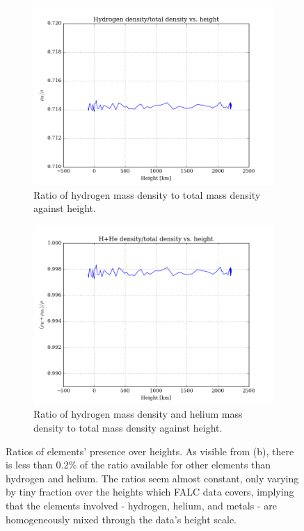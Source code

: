 \documentclass[11pt,a4paper,notitlepage]{article}
\begin{document}
\begin{figure}[H]
\center

	\begin{subfigure}{0.49\textwidth}
	\includegraphics[scale=0.42]{../figs/ratio_Hmassdens_of_dens_vs_h.png}
	\caption{Ratio of hydrogen mass density to total mass density against height.}
	\end{subfigure}
	\hfill
	\begin{subfigure}{0.49\textwidth}
	\includegraphics[scale=0.42]{../figs/ratio_HHemassdens_of_dens_vs_h.png}
	\caption{Ratio of hydrogen mass density and helium mass density to total mass density against height.}
	\end{subfigure}

\caption{Ratios of elements' presence over heights. As visible from (b), there is less than 0.2\% of the ratio available for other elements than hydrogen and helium. The ratios seem almost constant, only varying by tiny fraction over the heights which FALC data covers, implying that the elements involved - hydrogen, helium, and metals - are homogeneously mixed through the data's height scale.}
\end{figure}
\end{document}
